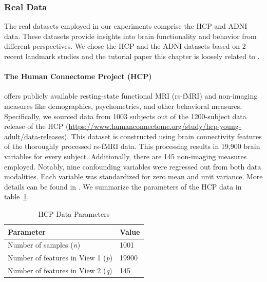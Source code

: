 \subsubsection{Real Data}

The real datasets employed in our experiments comprise the HCP and ADNI data.
These datasets provide insights into brain functionality and behavior from different perspectives.
We chose the HCP and the ADNI datasets based on 2 recent landmark studies and the tutorial paper this chapter is loosely related to \citep{mihalik2022canonical}.

\paragraph{The Human Connectome Project (HCP)} offers publicly available resting-state functional MRI (rs-fMRI) and non-imaging measures like demographics, psychometrics, and other behavioral measures.
Specifically, we sourced data from 1003 subjects out of the 1200-subject data release of the HCP (\url{https://www.humanconnectome.org/study/hcp-young-adult/data-releases}). This dataset is constructed using brain connectivity features of the thoroughly processed rs-fMRI data.
This processing results in 19,900 brain variables for every subject.
Additionally, there are 145 non-imaging measures employed.
Notably, nine confounding variables were regressed out from both data modalities.
Each variable was standardized for zero mean and unit variance.
More details can be found in \citep{smith2015positive, mihalik2022canonical}.
We summarize the parameters of the HCP data in table~\ref{table:hcp-parameters}.

\begin{table}
\centering
\caption{HCP Data Parameters}
\begin{tabular}{| l | l |}
\hline
\textbf{Parameter} & \textbf{Value} \\
\hline
Number of samples (\textit{n}) & 1001 \\
Number of features in View 1 (\textit{p}) & 19900 \\
Number of features in View 2 (\textit{q}) & 145 \\
\hline
\end{tabular}\label{table:hcp-parameters}
\end{table}



